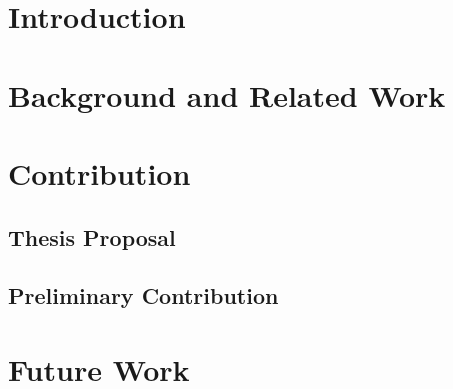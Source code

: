 \documentclass[12pt]{article}
\begin{document}
\section{Introduction}\label{sec:intro}

\section{Background and Related Work}\label{sec:related}

\section{Contribution}\label{sec:contribution}

\subsection{Thesis Proposal}\label{sec:proposal}

\subsection{Preliminary Contribution}\label{sec:preliminary}

\section{Future Work}\label{sec:future}




\noindent
\nocite{*}



\end{document}
